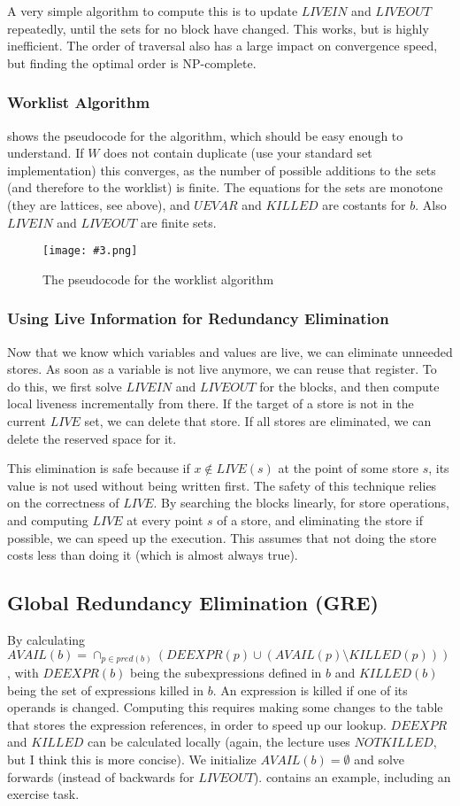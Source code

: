\documentclass{article}
\newcommand{\fig}[4]{
	\begin{figure}[#1]
		\center
		\texttt{[image: \#3.png]}
		\caption{#4}
		\label{fig:#3}
	\end{figure}
	}
\begin{document}
A very simple algorithm to compute this is to update $LIVEIN$ and $LIVEOUT$ repeatedly, until the sets for no block have changed.
This works, but is highly inefficient.
The order of traversal also has a large impact on convergence speed, but finding the optimal order is NP-complete.

\subsubsection{Worklist Algorithm}
 shows the pseudocode for the algorithm, which should be easy enough to understand.
If $W$ does not contain duplicate (use your standard set implementation) this converges, as the number of possible additions to the sets (and therefore to the worklist) is finite.
The equations for the sets are monotone (they are lattices, see above), and $UEVAR$ and $KILLED$ are costants for $b$.
Also $LIVEIN$ and $LIVEOUT$ are finite sets.

\fig{h}{0.6}{worklist}{The pseudocode for the worklist algorithm}

\subsubsection{Using Live Information for Redundancy Elimination}
Now that we know which variables and values are live, we can eliminate unneeded stores.
As soon as a variable is not live anymore, we can reuse that register.
To do this, we first solve $LIVEIN$ and $LIVEOUT$ for the blocks, and then compute local liveness incrementally from there.
If the target of a store is not in the current $LIVE$ set, we can delete that store.
If all stores are eliminated, we can delete the reserved space for it.

This elimination is safe because if $x \notin LIVE(s)$ at the point of some store $s$, its value is not used without being written first.
The safety of this technique relies on the correctness of $LIVE$.
By searching the blocks linearly, for store operations, and computing $LIVE$ at every point $s$ of a store, and eliminating the store if possible, we can speed up the execution.
This assumes that not doing the store costs less than doing it (which is almost always true).

\subsection{Global Redundancy Elimination (GRE)}
By calculating $AVAIL(b) = \cap_{p \in pred(b)} (DEEXPR(p) \cup (AVAIL(p) \setminus KILLED(p)))$, with $DEEXPR(b)$ being the subexpressions defined in $b$ and $KILLED(b)$ being the set of expressions killed in $b$.
An expression is killed if one of its operands is changed.
Computing this requires making some changes to the table that stores the expression references, in order to speed up our lookup.
$DEEXPR$ and $KILLED$ can be calculated locally (again, the lecture uses $NOTKILLED$, but I think this is more concise).
We initialize $AVAIL(b) = \emptyset$ and solve forwards (instead of backwards for $LIVEOUT$).
 contains an example, including an exercise task.
\end{document}
